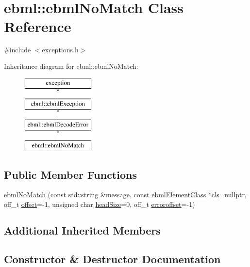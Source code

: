 \hypertarget{classebml_1_1ebmlNoMatch}{}\section{ebml\+:\+:ebml\+No\+Match Class Reference}
\label{classebml_1_1ebmlNoMatch}


{\ttfamily \#include $<$exceptions.\+h$>$}

Inheritance diagram for ebml\+:\+:ebml\+No\+Match\+:\begin{figure}[H]
\begin{center}
\leavevmode
\includegraphics[height=4.000000cm]{classebml_1_1ebmlNoMatch}
\end{center}
\end{figure}
\subsection*{Public Member Functions}
\begin{DoxyCompactItemize}
\item 
\mbox{\hyperlink{classebml_1_1ebmlNoMatch_aa17ff365ad72c2d723582442dd2295b8}{ebml\+No\+Match}} (const std\+::string \&message, const \mbox{\hyperlink{classebml_1_1ebmlElementClass}{ebml\+Element\+Class}} $\ast$\mbox{\hyperlink{classebml_1_1ebmlDecodeError_a3568b4ea3cd5bd16b9510abfe269920f}{cls}}=nullptr, off\+\_\+t \mbox{\hyperlink{classebml_1_1ebmlDecodeError_ad32ac9b3dd52f1c11479085d9c665e0f}{offset}}=-\/1, unsigned char \mbox{\hyperlink{classebml_1_1ebmlDecodeError_a61a4d4856f0c779a1c216e45dc5a7c1e}{head\+Size}}=0, off\+\_\+t \mbox{\hyperlink{classebml_1_1ebmlDecodeError_acb525117e0109d9640fb5e8c546e9a02}{erroroffset}}=-\/1)
\end{DoxyCompactItemize}
\subsection*{Additional Inherited Members}


\subsection{Constructor \& Destructor Documentation}
\mbox{\label{classebml_1_1ebmlNoMatch_aa17ff365ad72c2d723582442dd2295b8}} 
